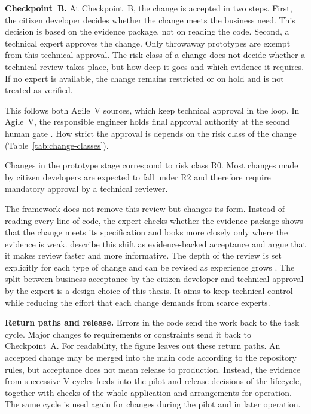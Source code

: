 \documentclass[10pt,a4paper]{article}
\begin{document}
\textbf{Checkpoint~B.} At Checkpoint~B, the change is accepted in two steps.
First, the citizen developer decides whether the change meets the business
need. This decision is based on the evidence package, not on reading the
code. Second, a technical expert approves the change. Only throwaway
prototypes are exempt from this technical approval. The risk class of a
change does not decide whether a technical review takes place, but how deep
it goes and which evidence it requires. If no expert is available, the change
remains restricted or on hold and is not treated as verified.

This follows both Agile~V sources, which keep technical approval in the loop.
In Agile~V, the responsible engineer holds final approval authority at the
second human gate \parencite{koch2026agile}. How strict the approval is
depends on the risk class of the change (Table~\ref{tab:change-classes}).

Changes in the prototype stage correspond to risk class R0. Most changes made by
citizen developers are expected to fall under R2 and therefore require
mandatory approval by a technical reviewer.

The framework does not remove this review but changes its form. Instead of
reading every line of code, the expert checks whether the evidence package
shows that the change meets its specification and looks more closely only
where the evidence is weak. \textcite{diaz2026} describe this shift as
evidence-backed acceptance and argue that it makes review faster and more
informative. The depth of the review is set explicitly for each type of
change and can be revised as experience grows \parencite{diaz2026}. The split
between business acceptance by the citizen developer and technical approval
by the expert is a design choice of this thesis. It aims to keep technical
control while reducing the effort that each change demands from scarce
experts.

\textbf{Return paths and release.} Errors in the code send the work back to
the task cycle. Major changes to requirements or constraints send it back to
Checkpoint~A. For readability, the figure leaves out these return paths. An
accepted change may be merged into the main code according to the repository
rules, but acceptance does not mean release to production. Instead, the
evidence from successive V-cycles feeds into the pilot and release decisions
of the lifecycle, together with checks of the whole application and
arrangements for operation. The same cycle is used again for changes during
the pilot and in later operation.
\end{document}
